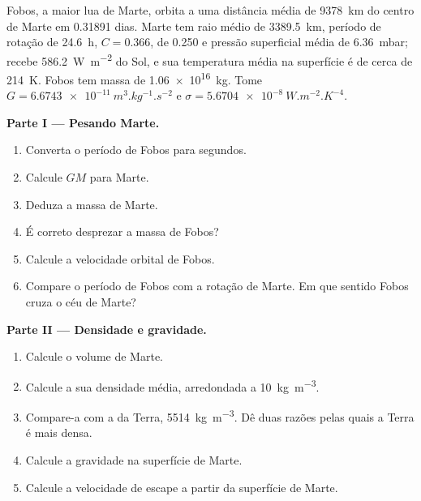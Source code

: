 \begin{problem}
\label{pb:b1:comparative-planetology:1}
Fobos, a maior lua de Marte, orbita a uma distância média de
\qty{9378}{km} do centro de Marte em \num{0.31891} dias. Marte tem raio médio de \qty{3389.5}{km}, período de rotação de \qty{24.6}{h},  $C = 0.366$,  de 0.250 e pressão superficial média de \qty{6.36}{mbar}; recebe \qty{586.2}{W.m^{-2}} do Sol, e sua temperatura média na superfície é de cerca de \qty{214}{K}. Fobos tem massa de \qty{1.06e16}{kg}. Tome $G = \qty{6.6743e-11}{m^3.kg^{-1}.s^{-2}}$ e $\sigma = \qty{5.6704e-8}{W.m^{-2}.K^{-4}}$.

\medskip
\noindent\textbf{Parte I --- Pesando Marte.}
\begin{enumerate}
  \item Converta o período de Fobos para segundos.
  \item Calcule $GM$ para Marte.
  \item Deduza a massa de Marte.
  \item É correto desprezar a massa de Fobos?
  \item Calcule a velocidade orbital de Fobos.
  \item Compare o período de Fobos com a rotação de Marte. Em que sentido Fobos cruza o céu de Marte?
\end{enumerate}

\medskip
\noindent\textbf{Parte II --- Densidade e gravidade.}
\begin{enumerate}[resume]
  \item Calcule o volume de Marte.
  \item Calcule a sua densidade média, arredondada a \qty{10}{kg.m^{-3}}.
  \item Compare-a com a da Terra, \qty{5514}{kg.m^{-3}}. Dê duas razões pelas quais a Terra é mais densa.
  \item Calcule a gravidade na superfície de Marte.
  \item Calcule a velocidade de escape a partir da superfície de Marte.
\end{enumerate}


\end{problem}
